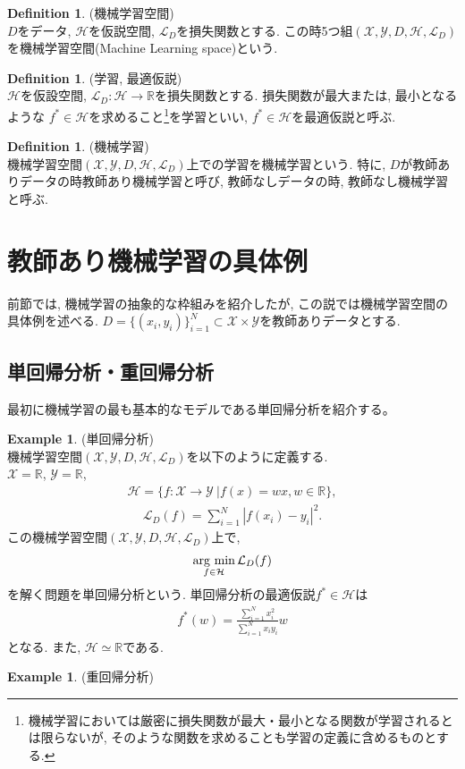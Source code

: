 \documentclass[11pt, a4paper, dvipdfmx]{jsarticle}
\theoremstyle{definition}
\newtheorem{Definition+}[Axiom+]{Definition}
\newtheorem{Example+}[Axiom+]{Example}
\newcommand{\R}{\mathbb{R}}
\newcommand{\X}{\mathcal{X}}
\newcommand{\Y}{\mathcal{Y}}
\newcommand{\Hil}{\mathcal{H}}
\newcommand{\Loss}{\mathcal{L}_{D}}
\newcommand{\MLsp}{(\X, \Y, D, \Hil, \Loss)}
\newcommand{\argmin}{\mathop{\rm arg~min}\limits}
\begin{document}
\begin{Definition+}(機械学習空間)\\
    $D$をデータ, $\Hil$を仮説空間, $\Loss$を損失関数とする. 
    この時5つ組$\MLsp$を機械学習空間(Machine Learning space)という.
\end{Definition+}
\begin{Definition+}(学習, 最適仮説)\\
    $\Hil$を仮設空間, $\Loss:\Hil\to\R$を損失関数とする. 損失関数が最大または, 最小となるような
    $f^*\in\Hil$を求めること\footnote{機械学習においては厳密に損失関数が最大・最小となる関数が学習されるとは限らないが, そのような関数を求めることも学習の定義に含めるものとする. }を学習といい, $f^*\in\Hil$を最適仮説と呼ぶ.
\end{Definition+}
\begin{Definition+}(機械学習)\\
    機械学習空間$\MLsp$上での学習を機械学習という. 特に, $D$が教師ありデータの時教師あり機械学習と呼び, 
    教師なしデータの時, 教師なし機械学習と呼ぶ.
\end{Definition+}

\section{教師あり機械学習の具体例}
前節では, 機械学習の抽象的な枠組みを紹介したが, この説では機械学習空間の具体例を述べる.
$D = \{(x_i, y_i)\}_{i = 1}^{N}\subset\X\times\Y$を教師ありデータとする.

\subsection{単回帰分析・重回帰分析}
最初に機械学習の最も基本的なモデルである単回帰分析を紹介する。
\begin{Example+}(単回帰分析)\\
    機械学習空間$\MLsp$を以下のように定義する.\\
    $\X = \R$, $\Y = \R$, 
    \begin{align*}
        \Hil = \{f:\X\to\Y~|f(x) = wx, w\in\R\},
    \end{align*}
    \begin{align*}
        \Loss(f) = \sum_{i = 1}^{N}|f(x_i) - y_i|^2.
    \end{align*}
    この機械学習空間$\MLsp$上で,
    \begin{align*}
        \argmin_{f\in\Hil}\Loss(f)
    \end{align*}
    を解く問題を単回帰分析という. 単回帰分析の最適仮説$f^{*}\in\Hil$は
    \begin{align*}
        f^{*}(w) = \frac{\sum_{i = 1}^{N}x_{i}^2}{\sum_{i = 1}^{N}x_{i}y_{i}}w
    \end{align*}
    となる. また, $\Hil\simeq\R$である.
\end{Example+}
\begin{Example+}(重回帰分析)
    
\end{Example+}
\end{document}
